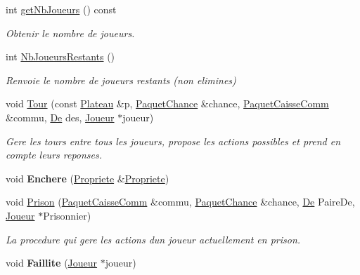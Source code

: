 \begin{DoxyCompactItemize}
\item 
int \hyperlink{classJeu_addcdf6347e6c0a409bc385ced6965f56}{get\+Nb\+Joueurs} () const 
\begin{DoxyCompactList}\small\item\em Obtenir le nombre de joueurs. \end{DoxyCompactList}\item 
int \hyperlink{classJeu_ad9afa609474f21234d2c78643dfb4bdc}{Nb\+Joueurs\+Restants} ()
\begin{DoxyCompactList}\small\item\em Renvoie le nombre de joueurs restants (non elimines) \end{DoxyCompactList}\item 
void \hyperlink{classJeu_a3f52f74bdf70e7395c65910ab577ff4d}{Tour} (const \hyperlink{classPlateau}{Plateau} \&p, \hyperlink{classPaquetChance}{Paquet\+Chance} \&chance, \hyperlink{classPaquetCaisseComm}{Paquet\+Caisse\+Comm} \&commu, \hyperlink{classDe}{De} des, \hyperlink{classJoueur}{Joueur} $\ast$joueur)
\begin{DoxyCompactList}\small\item\em Gere les tours entre tous les joueurs, propose les actions possibles et prend en compte leurs reponses. \end{DoxyCompactList}\item 
void {\bfseries Enchere} (\hyperlink{classPropriete}{Propriete} \&\hyperlink{classPropriete}{Propriete})\hypertarget{classJeu_ac2bb145d9a3e0b37686a6167ae8028fa}{}\label{classJeu_ac2bb145d9a3e0b37686a6167ae8028fa}

\item 
void \hyperlink{classJeu_a347c8cfc514cdf3e38a9aed2d9af5619}{Prison} (\hyperlink{classPaquetCaisseComm}{Paquet\+Caisse\+Comm} \&commu, \hyperlink{classPaquetChance}{Paquet\+Chance} \&chance, \hyperlink{classDe}{De} Paire\+De, \hyperlink{classJoueur}{Joueur} $\ast$Prisonnier)
\begin{DoxyCompactList}\small\item\em La procedure qui gere les actions d\textquotesingle{}un joueur actuellement en prison. \end{DoxyCompactList}\item 
void {\bfseries Faillite} (\hyperlink{classJoueur}{Joueur} $\ast$joueur)\hypertarget{classJeu_a92d118fa02f22692a5add86578e8f426}{}\label{classJeu_a92d118fa02f22692a5add86578e8f426}

\end{DoxyCompactItemize}


